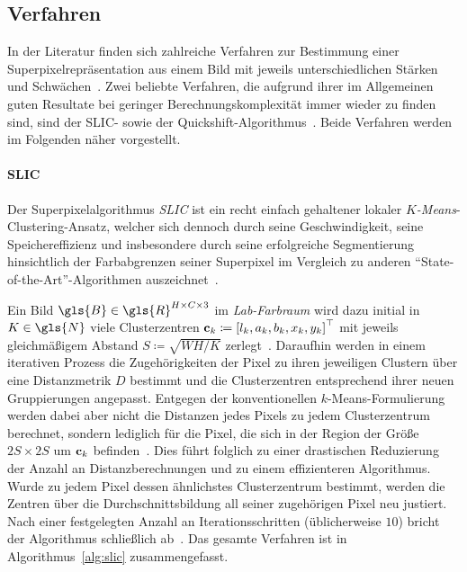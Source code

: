 \subsection{Verfahren}
\label{superpixel_verfahren}

In der Literatur finden sich zahlreiche Verfahren zur Bestimmung einer Superpixelrepräsentation aus einem Bild mit jeweils unterschiedlichen Stärken und Schwächen~\cite{super, slic}.
Zwei beliebte Verfahren, die aufgrund ihrer im Allgemeinen guten Resultate bei geringer Berechnungskomplexität immer wieder zu finden sind, sind der SLIC- sowie der Quickshift-Algorithmus~\cite{slic, super, Gadde, supercnn, Fulkerson}.
Beide Verfahren werden im Folgenden näher vorgestellt.

\paragraph{SLIC}
\label{slic}

Der Superpixelalgorithmus \emph{\gls{SLIC}} ist ein recht einfach gehaltener lokaler \emph{$K$-Means}-Clustering-Ansatz, welcher sich dennoch durch seine Geschwindigkeit, seine Speichereffizienz und insbesondere durch seine erfolgreiche Segmentierung hinsichtlich der Farbabgrenzen seiner Superpixel im Vergleich zu anderen \enquote{State-of-the-Art}-Algorithmen auszeichnet~\cite{slic, Gadde}.

Ein Bild $\gls{B} \in \gls{R}^{H \times C \times 3}$ im \emph{Lab-Farbraum} wird dazu initial in $K \in \gls{N}$ viele Clusterzentren $\ve{c}_k \coloneqq {\left[l_k, a_k, b_k, x_k, y_k\right]}^{\top}$  mit jeweils gleichmäßigem Abstand $S \coloneqq \sqrt{WH/K}$ zerlegt~\cite{slic}.
Daraufhin werden in einem iterativen Prozess die Zugehörigkeiten der Pixel zu ihren jeweiligen Clustern über eine Distanzmetrik $D$ bestimmt und die Clusterzentren entsprechend ihrer neuen Gruppierungen angepasst.
Entgegen der konventionellen $k$-Means-Formulierung werden dabei aber nicht die Distanzen jedes Pixels zu jedem Clusterzentrum berechnet, sondern lediglich für die Pixel, die sich in der Region der Größe $2S \times 2S$ um $\mathbf{c}_k$ befinden~\cite{slic}.
Dies führt folglich zu einer drastischen Reduzierung der Anzahl an Distanzberechnungen und zu einem effizienteren Algorithmus.
Wurde zu jedem Pixel dessen ähnlichstes Clusterzentrum bestimmt, werden die Zentren über die Durchschnittsbildung all seiner zugehörigen Pixel neu justiert.
Nach einer festgelegten Anzahl an Iterationsschritten (üblicherweise $10$) bricht der Algorithmus schließlich ab~\cite{slic}.
Das gesamte Verfahren ist in Algorithmus~\ref{alg:slic} zusammengefasst.

